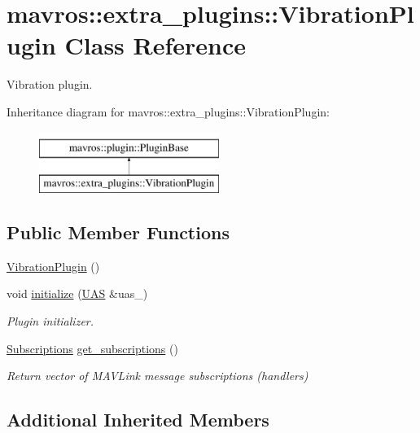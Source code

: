 \hypertarget{classmavros_1_1extra__plugins_1_1VibrationPlugin}{}\section{mavros\+::extra\+\_\+plugins\+::Vibration\+Plugin Class Reference}
\label{classmavros_1_1extra__plugins_1_1VibrationPlugin}


Vibration plugin.  


Inheritance diagram for mavros\+::extra\+\_\+plugins\+::Vibration\+Plugin\+:\begin{figure}[H]
\begin{center}
\leavevmode
\includegraphics[height=2.000000cm]{classmavros_1_1extra__plugins_1_1VibrationPlugin}
\end{center}
\end{figure}
\subsection*{Public Member Functions}
\begin{DoxyCompactItemize}
\item 
\mbox{\hyperlink{group__plugin_ga53355fa4e5a753bea611c2c7f0ee3cf2}{Vibration\+Plugin}} ()
\item 
void \mbox{\hyperlink{group__plugin_gaa344b18446d091fdcc0d29f71de47b59}{initialize}} (\mbox{\hyperlink{classmavros_1_1UAS}{U\+AS}} \&uas\+\_\+)
\begin{DoxyCompactList}\small\item\em Plugin initializer. \end{DoxyCompactList}\item 
\mbox{\hyperlink{group__plugin_ga8967d61fc77040e0c3ea5a4585d62a09}{Subscriptions}} \mbox{\hyperlink{group__plugin_gaf1faf27433bea5d716042d52aeaee805}{get\+\_\+subscriptions}} ()
\begin{DoxyCompactList}\small\item\em Return vector of M\+A\+V\+Link message subscriptions (handlers) \end{DoxyCompactList}\end{DoxyCompactItemize}
\subsection*{Additional Inherited Members}


